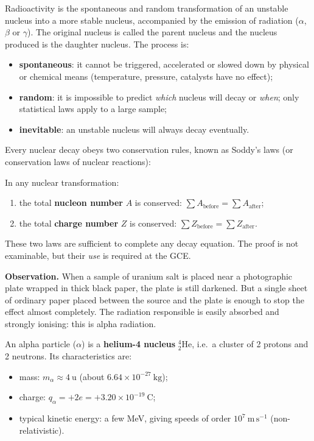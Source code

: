 \documentclass[11pt]{article}
\newcommand{\cle}[1]{{\popxbold\color{popdark}#1}}
\newcounter{popsec}
\newcounter{popsub}
\newcommand{\courssub}[1]{%
  \stepcounter{popsub}%
  \par\vspace{9pt}\noindent{\popxbold\fontsize{11.5}{13}\selectfont\color{popink}{\color{poporange}\thepopsec.\thepopsub}\hspace{6pt}#1}\par\nopagebreak\vspace{4pt}
}
\begin{document}
\begin{definition}[Radioactivity]
\cle{Radioactivity} is the spontaneous and random transformation of an unstable nucleus into a more stable nucleus, accompanied by the emission of radiation ($\alpha$, $\beta$ or $\gamma$). The original nucleus is called the \cle{parent nucleus} and the nucleus produced is the \cle{daughter nucleus}. The process is:
\begin{itemize}
\item \textbf{spontaneous}: it cannot be triggered, accelerated or slowed down by physical or chemical means (temperature, pressure, catalysts have no effect);
\item \textbf{random}: it is impossible to predict \emph{which} nucleus will decay or \emph{when}; only statistical laws apply to a large sample;
\item \textbf{inevitable}: an unstable nucleus will always decay eventually.
\end{itemize}
\end{definition}

Every nuclear decay obeys two conservation rules, known as \cle{Soddy's laws} (or conservation laws of nuclear reactions):

\begin{propriete}
In any nuclear transformation:
\begin{enumerate}
\item the total \textbf{nucleon number} $A$ is conserved: $\sum A_{\text{before}} = \sum A_{\text{after}}$;
\item the total \textbf{charge number} $Z$ is conserved: $\sum Z_{\text{before}} = \sum Z_{\text{after}}$.
\end{enumerate}
These two laws are sufficient to complete any decay equation. The proof is not examinable, but their \emph{use} is required at the GCE.
\end{propriete}

\courssub{Alpha Radiation}

\textbf{Observation.} When a sample of uranium salt is placed near a photographic plate wrapped in thick black paper, the plate is still darkened. But a single sheet of ordinary paper placed between the source and the plate is enough to stop the effect almost completely. The radiation responsible is easily absorbed and strongly ionising: this is \cle{alpha radiation}.

\begin{definition}
An \cle{alpha particle} ($\alpha$) is a \textbf{helium-4 nucleus} \ensuremath{\mathrm{^{4}_{2}He}}, i.e.\ a cluster of 2 protons and 2 neutrons. Its characteristics are:
\begin{itemize}
\item mass: $m_\alpha \approx 4\ \mathrm{u}$ (about $6.64 \times 10^{-27}\ \mathrm{kg}$);
\item charge: $q_\alpha = +2e = +3.20 \times 10^{-19}\ \mathrm{C}$;
\item typical kinetic energy: a few MeV, giving speeds of order $10^{7}\ \mathrm{m\,s^{-1}}$ (non-relativistic).
\end{itemize}
\end{definition}
\end{document}
